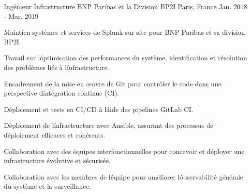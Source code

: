 \begin{cventries}
{    }


\cventry
{Ingénieur Infrastructure} %
{BNP Paribas et la Division BP2I} %
{Paris, France} %
{Jan. 2018 - Mar. 2019} %
{
  \begin{cvitems} %
    \item {Maintien systèmes et services de Splunk sur site pour BNP Paribas et sa division BP2I.}
   \item {Travail sur l\' optimisation des performances du système, identification et résolution des problèmes liés à l\' infrastructure.}
    \item {Encadrement de la mise en œuvre de Git pour contrôler le code dans une perspective d\' intégration continue (CI).}
    \item {Déploiement et tests en CI/CD à l\' aide des pipelines GitLab CI.}
    \item {Déploiement de l\' infrastructure avec Ansible, assurant des processus de déploiement efficaces et cohérents.}
    \item {Collaboration avec des équipes interfonctionnelles pour concevoir et déployer une infrastructure évolutive et sécurisée.}
    \item {Collaboration avec les membres de l\' équipe pour améliorer l\' observabilité générale du système et la surveillance.}
  \end{cvitems}
}


\end{cventries}
